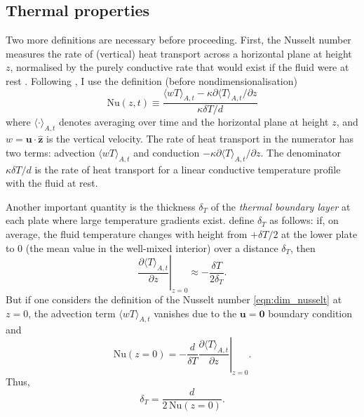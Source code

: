 \documentclass[titlepage,twoside]{article}
\numberwithin{equation}{section}
\newcommand{\pdiff}[2]{\frac{\partial #1}{\partial #2}}
\renewcommand\vec{\bm}
\newcommand{\uvec}[1]{\vec{\hat{#1}}}
\newcommand{\nusselt}{\ensuremath{\mathrm{Nu}}}
\begin{document}
\subsection{Thermal properties}
Two more definitions are necessary before proceeding.
First, the Nusselt number measures the rate of
(vertical) heat transport across a horizontal plane at height $z$, normalised
by the purely conductive rate that would exist if the fluid were at rest
\parencite{verzicco1999}. Following \textcite{chilla2012}, I use the definition
(before nondimensionalisation)
\begin{equation}
    \label{eqn:dim_nusselt}
    \nusselt(z,t) \equiv \frac{
        \langle wT \rangle_{A,t}
        - \kappa \partial \langle T \rangle_{A,t} / \partial z
    }{
        \kappa \delta T / d
    }
\end{equation}
where $\langle \cdot \rangle_{A,t}$ denotes averaging over time and the
horizontal plane at height $z$, and $w = \vec{u} \cdot \uvec{z}$ is the
vertical velocity. The rate of heat transport in the numerator has two terms:
advection $\langle wT \rangle_{A,t}$ and conduction $-\kappa \partial \langle T
\rangle_{A,t} / \partial z$. The denominator $\kappa \delta T / d$ is the rate
of heat transport for a linear conductive temperature profile with the fluid at
rest.

Another important quantity is the thickness $\delta_T$ of the \emph{thermal
boundary layer} at each plate where large temperature gradients exist.
\textcite{chilla2012} define $\delta_T$ as follows: if, on average, the fluid
temperature changes with height from $+\delta T/2$ at the lower plate to $0$
(the mean value in the well-mixed interior) over a distance $\delta_T$, then
\[
    \left. \pdiff{\langle T \rangle_{A,t}}{z} \right|_{z=0}
        \approx -\frac{\delta T}{2 \delta_T}.
\]
But if one considers the definition of the Nusselt number
\cref{eqn:dim_nusselt} at $z=0$, the advection term $\langle wT \rangle_{A,t}$
vanishes due to the $\vec{u} = \vec{0}$ boundary condition and
\[
    \nusselt(z=0) = -\frac{d}{\delta T}
        \left. \pdiff{\langle T \rangle_{A,t}}{z} \right|_{z=0}.
\]
Thus,
\begin{equation}
    \label{eqn:thermal_bl}
    \delta_T = \frac{d}{2\,\nusselt(z=0)}.
\end{equation}
\end{document}
